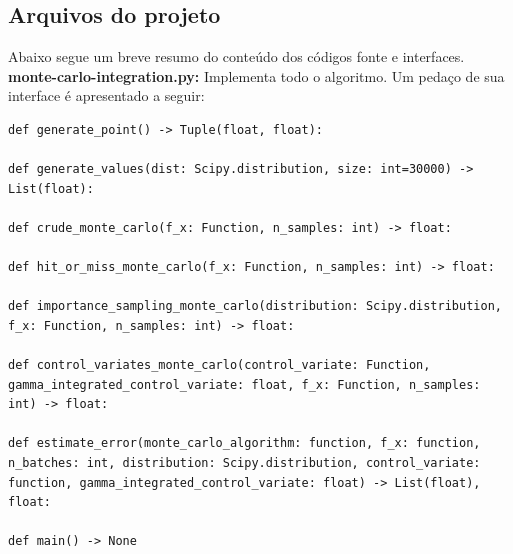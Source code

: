 \documentclass[twocolumn,amsmath,amssymb,floatfix]{revtex4}
\begin{document}
\subsection{Arquivos do projeto}
Abaixo segue um breve resumo do conteúdo dos códigos fonte e interfaces.
\\\indent \textbf{monte-carlo-integration.py:} Implementa todo o algoritmo. Um pedaço de sua interface é apresentado a seguir:
\begin{lstlisting}
def generate_point() -> Tuple(float, float):

def generate_values(dist: Scipy.distribution, size: int=30000) -> List(float):

def crude_monte_carlo(f_x: Function, n_samples: int) -> float:

def hit_or_miss_monte_carlo(f_x: Function, n_samples: int) -> float:

def importance_sampling_monte_carlo(distribution: Scipy.distribution, f_x: Function, n_samples: int) -> float:

def control_variates_monte_carlo(control_variate: Function, gamma_integrated_control_variate: float, f_x: Function, n_samples: int) -> float:

def estimate_error(monte_carlo_algorithm: function, f_x: function, n_batches: int, distribution: Scipy.distribution, control_variate: function, gamma_integrated_control_variate: float) -> List(float), float:

def main() -> None
\end{lstlisting}
\end{document}
